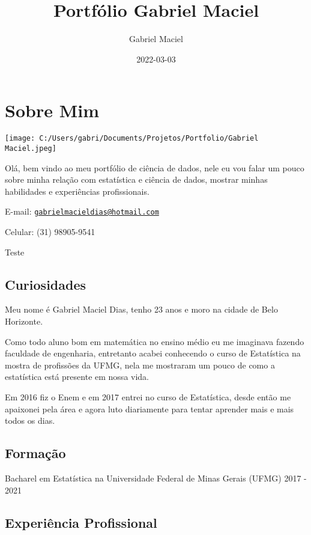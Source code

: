 \documentclass[
]{book}
\title{Portfólio Gabriel Maciel}
\author{Gabriel Maciel}
\date{2022-03-03}
\begin{document}
\maketitle

{
\setcounter{tocdepth}{1}
\tableofcontents
}
\hypertarget{sobre-mim}{%
\chapter{Sobre Mim}\label{sobre-mim}}

\texttt{[image: C:/Users/gabri/Documents/Projetos/Portfolio/Gabriel Maciel.jpeg]}

Olá, bem vindo ao meu portfólio de ciência de dados, nele eu vou falar um pouco sobre minha relação com estatística e ciência de dados, mostrar minhas habilidades e experiências profissionais.

E-mail: \href{mailto:gabrielmacieldias@hotmail.com}{\nolinkurl{gabrielmacieldias@hotmail.com}}

Celular: (31) 98905-9541

Teste

\hypertarget{curiosidades}{%
\section{Curiosidades}\label{curiosidades}}

Meu nome é Gabriel Maciel Dias, tenho 23 anos e moro na cidade de Belo Horizonte.

Como todo aluno bom em matemática no ensino médio eu me imaginava fazendo faculdade de engenharia, entretanto acabei conhecendo o curso de Estatística na mostra de profissões da UFMG, nela me mostraram um pouco de como a estatística está presente em nossa vida.

Em 2016 fiz o Enem e em 2017 entrei no curso de Estatística, desde então me apaixonei pela área e agora luto diariamente para tentar aprender mais e mais todos os dias.

\hypertarget{formauxe7uxe3o}{%
\section{Formação}\label{formauxe7uxe3o}}

Bacharel em Estatística na Universidade Federal de Minas Gerais (UFMG) 2017 - 2021

\hypertarget{experiuxeancia-profissional}{%
\section{Experiência Profissional}\label{experiuxeancia-profissional}}
\end{document}

